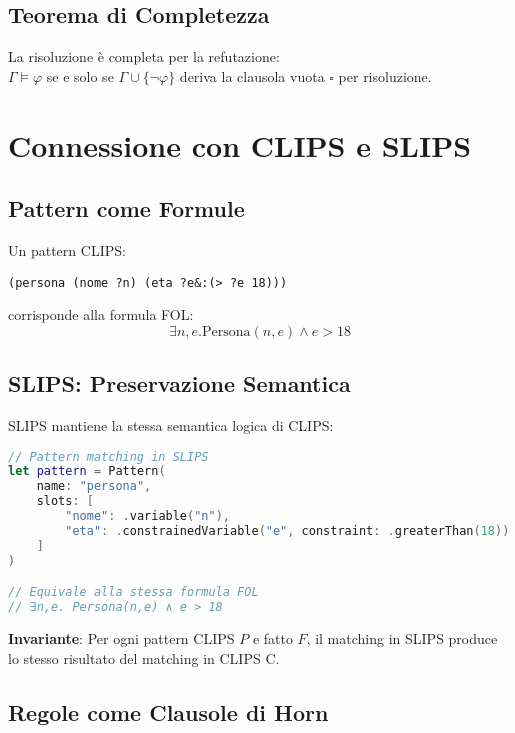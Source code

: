 \subsection{Teorema di Completezza}

\begin{teorema}
La risoluzione è completa per la refutazione: \\
$\Gamma \models \varphi$ se e solo se $\Gamma \cup \{\neg \varphi\}$ deriva la clausola vuota $\square$ per risoluzione.
\end{teorema}

\section{Connessione con CLIPS e SLIPS}

\subsection{Pattern come Formule}

Un pattern CLIPS:
\begin{lstlisting}[language=CLIPS]
(persona (nome ?n) (eta ?e&:(> ?e 18)))
\end{lstlisting}

corrisponde alla formula FOL:
\begin{equation}
\exists n, e. \text{Persona}(n, e) \land e > 18
\end{equation}

\subsection{SLIPS: Preservazione Semantica}

SLIPS mantiene la stessa semantica logica di CLIPS:

\begin{lstlisting}[language=Swift]
// Pattern matching in SLIPS
let pattern = Pattern(
    name: "persona",
    slots: [
        "nome": .variable("n"),
        "eta": .constrainedVariable("e", constraint: .greaterThan(18))
    ]
)

// Equivale alla stessa formula FOL
// ∃n,e. Persona(n,e) ∧ e > 18
\end{lstlisting}

\textbf{Invariante}: Per ogni pattern CLIPS $P$ e fatto $F$, il matching in SLIPS produce lo stesso risultato del matching in CLIPS C.

\subsection{Regole come Clausole di Horn}

